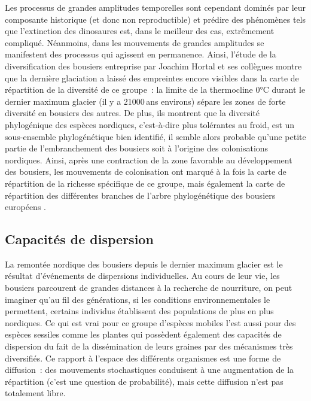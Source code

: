 Les processus de grandes amplitudes temporelles sont cependant dominés
par leur composante historique (et donc non reproductible) et prédire
des phénomènes tels que l'extinction des dinosaures est, dans le
meilleur des cas, extrêmement compliqué. Néanmoins, dans les mouvements
de grandes amplitudes se manifestent des processus qui agissent en
permanence. Ainsi, l'étude de la diversification des bousiers entreprise
par Joachim Hortal et ses collègues \citep{Hortal2011} montre que la
dernière glaciation a laissé des empreintes encore visibles dans la
carte de répartition de la diversité de ce groupe~: la limite de la
thermocline 0°C durant le dernier maximum glacier (il y a 21000 ans
environs) sépare les zones de forte diversité en bousiers des autres. De
plus, ils montrent que la diversité phylogénique des espèces nordiques,
c'est-à-dire plus tolérantes au froid, est un sous-ensemble
phylogénétique bien identifié, il semble alors probable qu'une petite
partie de l'embranchement des bousiers soit à l'origine des
colonisations nordiques. Ainsi, après une contraction de la zone
favorable au développement des bousiers, les mouvements de colonisation
ont marqué à la fois la carte de répartition de la richesse spécifique
de ce groupe, mais également la carte de répartition des différentes
branches de l'arbre phylogénétique des bousiers européens
\citep{Hortal2011}.

\subsection*{Capacités de dispersion}\label{capacituxe9s-de-dispersion}

La remontée nordique des bousiers depuis le dernier maximum glacier est
le résultat d'événements de dispersions individuelles. Au cours de leur
vie, les bousiers parcourent de grandes distances à la recherche de
nourriture, on peut imaginer qu'au fil des générations, si les
conditions environnementales le permettent, certains individus
établissent des populations de plus en plus nordiques. Ce qui est vrai
pour ce groupe d'espèces mobiles l'est aussi pour des espèces sessiles
comme les plantes qui possèdent également des capacités de dispersion du
fait de la dissémination de leurs graines par des mécanismes très
diversifiés. Ce rapport à l'espace des différents organismes est une
forme de diffusion~: des mouvements stochastiques conduisent à une
augmentation de la répartition (c'est une question de probabilité), mais
cette diffusion n'est pas totalement libre.

